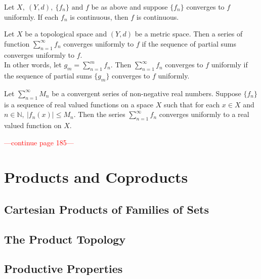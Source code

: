 \begin{proposition}
	Let \( X,\ (Y,d),\ \{ f_n \} \text{ and } f \) be as above and suppose \( \{ f_n \} \) converges to \( f \) uniformly. If each \( f_n \) is continuous, then \( f \) is continuous.
\end{proposition}

\begin{definition}
	Let \( X \) be a topological space and \( (Y,d) \) be a metric space. Then a series of function \( \sum^\infty_{n = 1} f_n \) converges uniformly to \( f \) if the sequence of partial sums converges uniformly to \( f \).\\

	In other words, let \( g_m = \sum^m_{n = 1} f_n \). Then \( \sum^\infty_{n = 1} f_n \) converges to \( f \) uniformly if the sequence of partial sums \( \{ g_m \} \) converges to \( f \) uniformly.
\end{definition}

\begin{proposition}
	Let \( \sum^\infty_{n = 1} M_n \) be a convergent series of non-negative real numbers. Suppose \( \{ f_n \} \) is a sequence of real valued functions on a space \( X \) such that for each \( x \in X \) and \( n \in \mathbb{N},\ |f_n(x)| \le M_n \). Then the series \( \sum^\infty_{n = 1} f_n \) converges uniformly to a real valued function on \( X \).
\end{proposition}
\textcolor{red}{---continue page 185---}

\section{Products and Coproducts}
\subsection{Cartesian Products of Families of Sets}
\subsection{The Product Topology}
\subsection{Productive Properties}

